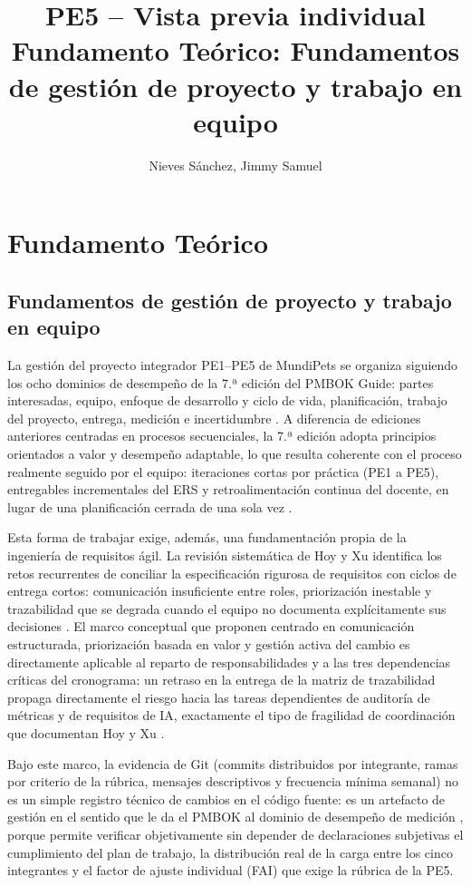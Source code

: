 \documentclass[12pt,a4paper]{article}
\title{PE5 -- Vista previa individual\\Fundamento Teórico: Fundamentos de gestión de proyecto y trabajo en equipo}
\author{Nieves Sánchez, Jimmy Samuel}
\date{}
\begin{document}
\maketitle


\section*{Fundamento Teórico}

\subsection*{Fundamentos de gestión de proyecto y trabajo en equipo}

La gestión del proyecto integrador PE1--PE5 de MundiPets se organiza siguiendo los
ocho dominios de desempeño de la 7.ª edición del PMBOK Guide: partes interesadas,
equipo, enfoque de desarrollo y ciclo de vida, planificación, trabajo del proyecto,
entrega, medición e incertidumbre \cite{pmbok7}. A diferencia de ediciones anteriores
centradas en procesos secuenciales, la 7.ª edición adopta principios orientados a
valor y desempeño adaptable, lo que resulta coherente con el proceso realmente
seguido por el equipo: iteraciones cortas por práctica (PE1 a PE5), entregables
incrementales del ERS y retroalimentación continua del docente, en lugar de una
planificación cerrada de una sola vez \cite{pmbok7}.

Esta forma de trabajar exige, además, una fundamentación propia de la ingeniería de
requisitos ágil. La revisión sistemática de Hoy y Xu identifica los retos recurrentes
de conciliar la especificación rigurosa de requisitos con ciclos de entrega cortos:
comunicación insuficiente entre roles, priorización inestable y trazabilidad que se
degrada cuando el equipo no documenta explícitamente sus decisiones \cite{hoy2023}.
El marco conceptual que proponen centrado en comunicación estructurada,
priorización basada en valor y gestión activa del cambio es directamente aplicable
al reparto de responsabilidades y a las tres dependencias
críticas del cronograma: un retraso en la entrega de la
matriz de trazabilidad propaga directamente el riesgo hacia las tareas dependientes
de auditoría de métricas y de requisitos de IA, exactamente el tipo de fragilidad de
coordinación que documentan Hoy y Xu \cite{hoy2023}.

Bajo este marco, la evidencia de Git (commits distribuidos por integrante, ramas por
criterio de la rúbrica, mensajes descriptivos y frecuencia mínima semanal) no es un
simple registro técnico de cambios en el código fuente: es un artefacto de gestión en
el sentido que le da el PMBOK al dominio de desempeño de medición \cite{pmbok7},
porque permite verificar objetivamente sin depender de declaraciones subjetivas
el cumplimiento del plan de trabajo, la distribución real de la carga entre los cinco
integrantes y el factor de ajuste individual (FAI) que exige la rúbrica de la PE5.


\end{document}
